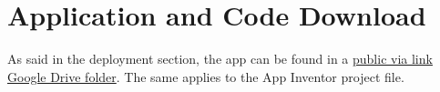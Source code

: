 \chapter{Application and Code Download}
As said in the deployment section, the app can be found in a \href{https://drive.google.com/drive/folders/1HNkbFOtjvBkk_PaII-yi2_qwW6sVlULS}{public via link Google Drive folder}. The same applies to the App Inventor project file.
